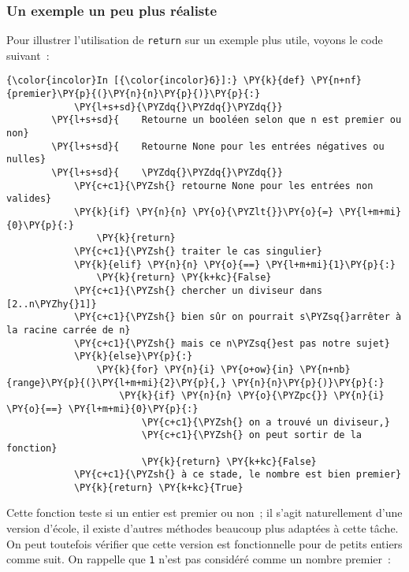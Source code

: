     \hypertarget{un-exemple-un-peu-plus-ruxe9aliste}{%
\subsubsection{Un exemple un peu plus
réaliste}\label{un-exemple-un-peu-plus-ruxe9aliste}}

    Pour illustrer l'utilisation de \texttt{return} sur un exemple plus
utile, voyons le code suivant~:

    \begin{Verbatim}[commandchars=\\\{\}]
{\color{incolor}In [{\color{incolor}6}]:} \PY{k}{def} \PY{n+nf}{premier}\PY{p}{(}\PY{n}{n}\PY{p}{)}\PY{p}{:}
            \PY{l+s+sd}{\PYZdq{}\PYZdq{}\PYZdq{}}
        \PY{l+s+sd}{    Retourne un booléen selon que n est premier ou non}
        \PY{l+s+sd}{    Retourne None pour les entrées négatives ou nulles}
        \PY{l+s+sd}{    \PYZdq{}\PYZdq{}\PYZdq{}}
            \PY{c+c1}{\PYZsh{} retourne None pour les entrées non valides}
            \PY{k}{if} \PY{n}{n} \PY{o}{\PYZlt{}}\PY{o}{=} \PY{l+m+mi}{0}\PY{p}{:}
                \PY{k}{return}
            \PY{c+c1}{\PYZsh{} traiter le cas singulier}
            \PY{k}{elif} \PY{n}{n} \PY{o}{==} \PY{l+m+mi}{1}\PY{p}{:}
                \PY{k}{return} \PY{k+kc}{False}
            \PY{c+c1}{\PYZsh{} chercher un diviseur dans [2..n\PYZhy{}1]}
            \PY{c+c1}{\PYZsh{} bien sûr on pourrait s\PYZsq{}arrêter à la racine carrée de n}
            \PY{c+c1}{\PYZsh{} mais ce n\PYZsq{}est pas notre sujet}
            \PY{k}{else}\PY{p}{:}
                \PY{k}{for} \PY{n}{i} \PY{o+ow}{in} \PY{n+nb}{range}\PY{p}{(}\PY{l+m+mi}{2}\PY{p}{,} \PY{n}{n}\PY{p}{)}\PY{p}{:}
                    \PY{k}{if} \PY{n}{n} \PY{o}{\PYZpc{}} \PY{n}{i} \PY{o}{==} \PY{l+m+mi}{0}\PY{p}{:}
                        \PY{c+c1}{\PYZsh{} on a trouvé un diviseur,}
                        \PY{c+c1}{\PYZsh{} on peut sortir de la fonction}
                        \PY{k}{return} \PY{k+kc}{False}
            \PY{c+c1}{\PYZsh{} à ce stade, le nombre est bien premier}
            \PY{k}{return} \PY{k+kc}{True}
\end{Verbatim}


    Cette fonction teste si un entier est premier ou non~; il s'agit
naturellement d'une version d'école, il existe d'autres méthodes
beaucoup plus adaptées à cette tâche. On peut toutefois vérifier que
cette version est fonctionnelle pour de petits entiers comme suit. On
rappelle que \texttt{1} n'est pas considéré comme un nombre premier~:

